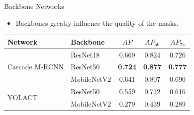 \documentclass[18pt]{beamer}
\begin{document}
\begin{frame}{Backbone Networks}
\begin{itemize}
    \item Backbones greatly influence the quality of the masks.
\end{itemize}
\begin{table}[H]
    \centering
        \begin{tabular}{ll | ccc}
            \toprule
            Network                         & Backbone      & $AP$              & $AP_{50}$         & $AP_{75}$ \\
            \midrule
            \multirow{3}{*}{Cascade M-RCNN} & ResNet18      & 0.669 			&  0.824 &  0.726 \\
            \multirow{1}{*}{}               & ResNet50      & \textbf{0.724} 	&  \textbf{0.877} &  \textbf{0.777} \\
            \multirow{1}{*}{}               & MobileNetV2   & 0.641 			&  0.807 &  0.690 \\
            \cline{3-5}
            \multirow{2}{*}{YOLACT}         & ResNet50      &  0.559 			&  0.712 &  0.616  \\
            \multirow{1}{*}{}               & MobileNetV2   &  0.279 			&  0.439 &  0.289  \\
            \bottomrule
        \end{tabular}
\end{table}
\end{frame}
\end{document}
